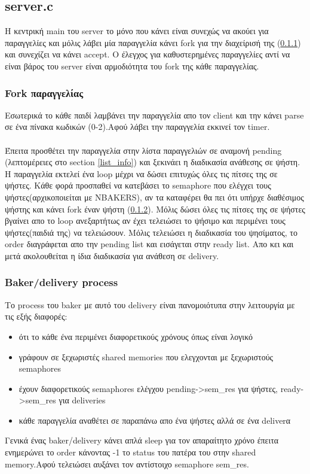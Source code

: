 \documentclass{article}
\begin{document}
\subsection{server.c}
Η κεντρική main του server το μόνο που κάνει είναι συνεχώς να ακούει για παραγγελίες και μόλις λάβει μία παραγγελία κάνει fork για την διαχείρισή της (\ref{order}) και συνεχίζει να κάνει accept. Ο έλεγχος για καθυστερημένες παραγγελίες αντί να είναι βάρος του server είναι αρμοδιότητα του fork της κάθε παραγγελίας.

\subsubsection{Fork παραγγελίας}
\label{order}
Εσωτερικά το κάθε παιδί λαμβάνει την παραγγελία απο τον client και την κάνει parse σε ένα πίνακα κωδικών (0-2).Αφού λάβει την παραγγελία εκκινεί τον timer.
\paragraph{}
Έπειτα προσθέτει την παραγγελία στην λίστα παραγγελιών σε αναμονή pending (λεπτομέρειες στο section \ref{list_info}) και ξεκινάει η διαδικασία ανάθεσης σε ψήστη. H παραγγελία εκτελεί ένα loop μέχρι να δώσει επιτυχώς όλες τις πίτσες της σε ψήστες. Κάθε φορά προσπαθεί να κατεβάσει το semaphore που ελέγχει τους ψήστες(αρχικοποιείται με NBAKERS), αν τα καταφέρει θα πει ότι υπήρχε διαθέσιμος ψήστης και κάνει fork έναν ψήστη (\ref{baker}). Μόλις δώσει όλες τις πίτσες της σε ψήστες βγαίνει απο το loop ανεξαρτήτως αν έχει τελειώσει το ψήσιμο και περιμένει τους ψήστες(παιδιά της) να τελειώσουν. Μόλις τελειώσει η διαδικασία του ψησίματος, το order διαγράφεται απο την pending list και εισάγεται στην ready list. Απο κει και μετά 
ακολουθείται η ίδια διαδικασία για ανάθεση σε delivery.

\subsubsection{Baker/delivery process}
\label{baker}
Το process του baker με αυτό του delivery είναι πανομοιότυπα στην λειτουργία με τις εξής διαφορές:
\begin{itemize}
 \item ότι το κάθε ένα περιμένει διαφορετικούς χρόνους όπως είναι λογικό
 \item γράφουν σε ξεχωριστές shared memories που ελεγχονται με ξεχωριστούς semaphores
 \item έχουν διαφορετικούς semaphores ελέγχου pending->sem\_res για ψήστες, ready->sem\_res για deliveries
 \item κάθε παραγγελία αναθέτει σε παραπάνω απο ένα ψήστες αλλά σε ένα deliverα
\end{itemize}
Γενικά ένας baker/delivery κάνει απλά sleep για τον απαραίτητο χρόνο έπειτα ενημερώνει το order κάνοντας -1 το status του πατέρα του στην shared memory.Αφού τελειώσει αυξάνει τον αντίστοιχο semaphore sem\_res.
\end{document}
